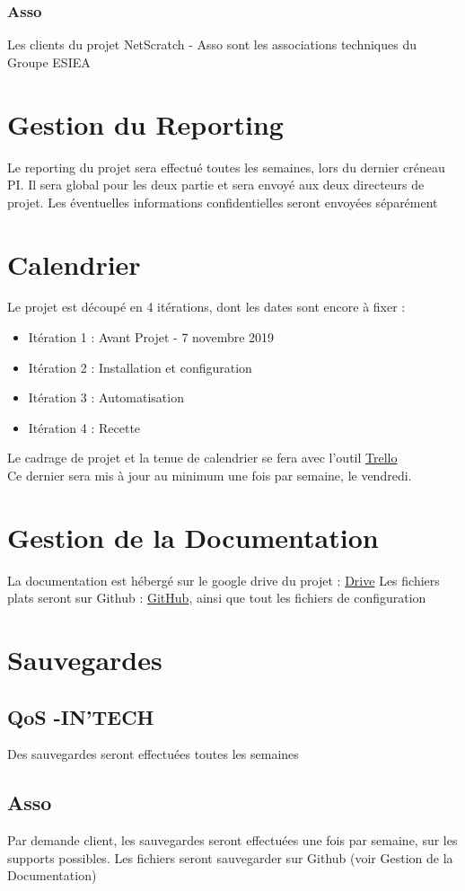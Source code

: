 \documentclass[14pt,a4paper]{extarticle}
\begin{document}
\subsubsection{Asso}
Les clients du projet NetScratch - Asso sont les associations techniques du Groupe ESIEA

\break
\section{Gestion du Reporting}
Le reporting du projet sera effectué toutes les semaines, lors du dernier créneau PI.
Il sera global pour les deux partie et sera envoyé aux deux directeurs de projet.
Les éventuelles informations confidentielles seront envoyées séparément
\section{Calendrier}
Le projet est découpé en 4 itérations, dont les dates sont encore à fixer :
\begin{itemize}
    \item{Itération 1 : Avant Projet - 7 novembre 2019}
    \item{Itération 2 : Installation et configuration}
    \item{Itération 3 : Automatisation}
    \item{Itération 4 : Recette}
\end{itemize}
Le cadrage de projet et la tenue de calendrier se fera avec l'outil \href{https://trello.com/b/XQZtrqGi}{Trello} \\
Ce dernier sera mis à jour au minimum une fois par semaine, le vendredi.
\section{Gestion de la Documentation}
La documentation est hébergé sur le google drive du projet : \href{https://drive.google.com/drive/folders/1G7gVQl3_Hf86D3YLuazpA_pVGj7RUXwx}{Drive}
Les fichiers plats seront sur Github : \href{https://github.com/daed4lus/NetScratch/}{GitHub}, ainsi que tout les fichiers de configuration

\break
\section{Sauvegardes}
\subsection{QoS -IN'TECH}
Des sauvegardes seront effectuées toutes les semaines
\subsection{Asso}
Par demande client, les sauvegardes seront effectuées une fois par semaine, sur les supports possibles. Les fichiers seront sauvegarder sur Github (voir Gestion de la Documentation)
\end{document}
